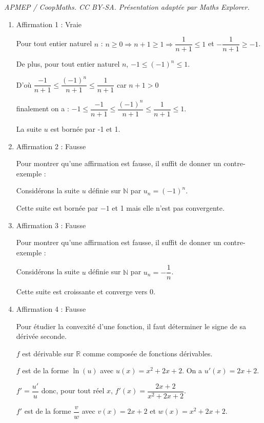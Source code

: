 \documentclass[10pt]{article}
\providecommand{\R}{\mathbb{R}}
\providecommand{\N}{\mathbb{N}}
\begin{document}
\noindent\textit{APMEP / CoopMaths. CC BY-SA. Présentation adaptée par Maths Explorer.}\par\medskip
\medskip

\begin{enumerate}
\item Affirmation 1 : Vraie

Pour tout entier naturel $n$ : $n\geqslant 0 \Longrightarrow n+1 \geqslant 1 \Longrightarrow \dfrac{1}{n+1} \leqslant 1$  et  $-\dfrac{1}{n+1} \geqslant -1$.

De plus,  pour tout entier naturel $n$, $-1 \leqslant (-1)^n \leqslant 1 $.

D'où $ \dfrac{-1}{n+1} \leqslant \dfrac{(-1)^n}{n+1} \leqslant \dfrac{1}{n+1}$ car $n+1 >0$

finalement on a : $-1 \leqslant \dfrac{-1}{n+1} \leqslant \dfrac{(-1)^n}{n+1} \leqslant \dfrac{1}{n+1}\leqslant 1$.

La suite $u$ est bornée par -1 et 1.

\item Affirmation 2 : Fausse

Pour montrer qu'une affirmation est fausse, il suffit de donner un contre-exemple :

Considérons la suite $u$ définie sur $\N$ par $u_n= (-1)^n$.

Cette suite est bornée par $-1$ et 1 mais elle n'est pas convergente.

\item Affirmation 3 : Fausse

Pour montrer qu'une affirmation est fausse, il suffit de donner un contre-exemple :

Considérons la suite $u$ définie sur $\N$ par $u_n=-\dfrac{1}{n}$.

Cette suite est croissante et converge vers 0.

\item Affirmation 4 : Fausse 

Pour étudier la convexité d'une fonction,  il faut déterminer le signe de sa dérivée seconde. 

$f$ est dérivable sur $\R$ comme composée de fonctions dérivables.

$f$ est de la forme $\ln(u)$ avec $u(x)=x^2+2x+2$.  On a $u'(x)=2x+2$.

$f'=\dfrac{u'}{u}$ donc, pour tout réel $x$, $f'(x)=\dfrac{2x+2}{x^2+2x+2}$.

$f'$ est de la forme $\dfrac{v}{w}$ avec $v(x)=2x+2$ et $w(x)=x^2+2x+2$.


\end{enumerate}
\end{document}
